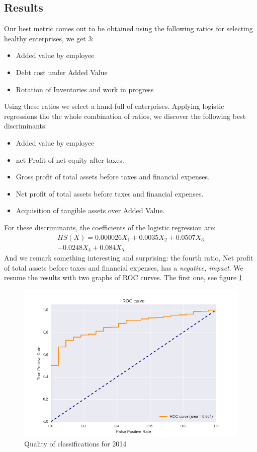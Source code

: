 \documentclass[DIV=calc, paper=a4, fontsize=11pt, twocolumn]{scrartcl}
\begin{document}
\subsection{Results}
Our best metric comes out to be obtained using the following ratios for selecting healthy enterprises, we get $3$:
\begin{itemize}
    \item Added value by employee
    \item Debt cost under Added Value
    \item Rotation of Inventories and work in progress 
\end{itemize}
Using these ratios we select a hand-full of enterprises. Applying logistic regressions tho the whole combination of ratios, we discover the following best discriminants:
\begin{itemize} %
  \item Added value by employee
  \item net Profit of net equity after taxes.
  \item Gross profit of total assets before taxes and financial expenses.
  \item Net profit of total assets before taxes and financial expenses.
  \item Acquisition of tangible assets over Added Value.
\end{itemize}
For these discriminants, the coefficients of the logistic regression are:
\begin{multline}
HS(X) = 0.000026X_1+0.0035X_2+0.0507X_3\\
-0.0248X_4 + 0.084X_5
\end{multline}
And we remark something interesting and surprising: the fourth ratio, Net profit of total assets before taxes and financial expenses, has a \emph{negative, impact}.
We resume the results with two graphs of ROC curves. The first one, see figure \ref{fig:roc_2014}
\begin{figure}
  \centering
    \includegraphics[width=\linewidth]{roc_2014}
  \caption{Quality of classifications for 2014}
  \label{fig:roc_2014}
\end{figure}
\end{document}
